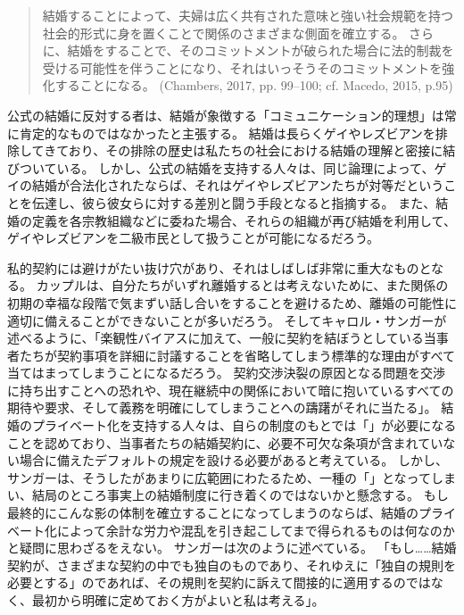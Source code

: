 \documentclass[paper=a4,book,openany]{jlreq}
\newcommand{\ig}[1]{}           %
\begin{document}
\begin{quote}
結婚することによって、夫婦は広く共有された意味と強い社会規範を持つ社会的形式に身を置くことで関係のさまざまな側面を確立する。
さらに、結婚をすることで、そのコミットメントが破られた場合に法的制裁を受ける可能性を伴うことになり、それはいっそうそのコミットメントを強化することになる。
(Chambers, 2017, pp. 99--100; cf. Macedo, 2015, p.95) \nocite{chambers17:againstmarriage} \nocite{macedo15:_just_married}\ig{Clare chmbers}
\end{quote}

公式の結婚に反対する者は、結婚が象徴する「コミュニケーション的理想」は常に肯定的なものではなかったと主張する。
結婚は長らくゲイやレズビアンを排除してきており、その排除の歴史は私たちの社会における結婚の理解と密接に結びついている。
しかし、公式の結婚を支持する人々は、同じ論理によって、ゲイの結婚が合法化されたならば、それはゲイやレズビアンたちが対等だということを伝達し、彼ら彼女らに対する差別と闘う手段となると指摘する。
また、結婚の定義を各宗教組織などに委ねた場合、それらの組織が再び結婚を利用して、ゲイやレズビアンを二級市民として扱うことが可能になるだろう\citep[cf.][p.205]{hartley12:_polit_liber_marriag_famil}。

私的契約には避けがたい抜け穴があり、それはしばしば非常に重大なものとなる。
カップルは、自分たちがいずれ離婚するとは考えないために、また関係の初期の幸福な段階で気まずい話し合いをすることを避けるため、離婚の可能性に適切に備えることができないことが多いだろう。
そしてキャロル・サンガーが述べるように、「楽観性バイアスに加えて、一般に契約を結ぼうとしている当事者たちが契約事項を詳細に討議することを省略してしまう標準的な理由がすべて当てはまってしまうことになるだろう。
契約交渉決裂の原因となる問題を交渉に持ち出すことへの恐れや、現在継続中の関係において暗に抱いているすべての期待や要求、そして義務を明確にしてしまうことへの躊躇がそれに当たる」\citep[p.1315]{sanger06:_case_civil_marriag}。
結婚のプライベート化を支持する人々は、自らの制度のもとでは「」が必要になることを認めており、当事者たちの結婚契約に、必要不可欠な条項が含まれていない場合に備えたデフォルトの規定を設ける必要があると考えている。
しかし、サンガーは、そうしたがあまりに広範囲にわたるため、一種の「」となってしまい、結局のところ事実上の結婚制度に行き着くのではないかと懸念する。
もし最終的にこんな影の体制を確立することになってしまうのならば、結婚のプライベート化によって余計な労力や混乱を引き起こしてまで得られるものは何なのかと疑問に思わざるをえない。
サンガーは次のように述べている。
「もし……結婚契約が、さまざまな契約の中でも独自のものであり、それゆえに「独自の規則を必要とする」のであれば、その規則を契約に訴えて間接的に適用するのではなく、最初から明確に定めておく方がよいと私は考える」\citep[p.1315]{sanger06:_case_civil_marriag}。
\end{document}
